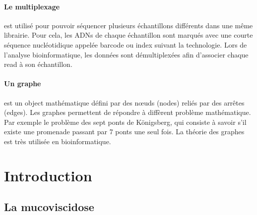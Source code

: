 \documentclass[12pt,a4paper]{article}
\begin{document}
\paragraph{Le multiplexage} est utilisé pour pouvoir séquencer plusieurs échantillons différents dans une même librairie. Pour cela, les ADNs de chaque échantillon sont marqués avec une courte séquence nucléotidique appelée barcode ou index suivant la technologie. Lors de l'analyse bioinformatique, les données sont démultiplexées afin d'associer chaque read à son échantillon.

\paragraph{Un graphe} est un object mathématique défini par des nœuds (nodes) reliés par des arrêtes (edges). Les graphes permettent de répondre à diffèrent problème mathématique. Par exemple le problème des sept ponts de Königsberg, qui consiste à savoir s'il existe une promenade passant par 7 ponts une seul fois. La théorie des graphes est très utilisée en bioinformatique.

\newpage

\setcounter{page}{1}

\section{Introduction}
\subsection{La mucoviscidose}
\end{document}
